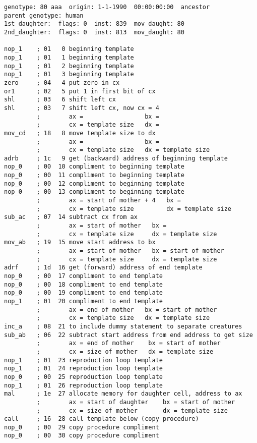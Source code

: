 \begin{verbatim}
genotype: 80 aaa  origin: 1-1-1990  00:00:00:00  ancestor
parent genotype: human
1st_daughter:  flags: 0  inst: 839  mov_daught: 80
2nd_daughter:  flags: 0  inst: 813  mov_daught: 80

nop_1    ; 01   0 beginning template
nop_1    ; 01   1 beginning template
nop_1    ; 01   2 beginning template
nop_1    ; 01   3 beginning template
zero     ; 04   4 put zero in cx
or1      ; 02   5 put 1 in first bit of cx
shl      ; 03   6 shift left cx
shl      ; 03   7 shift left cx, now cx = 4
         ;        ax =                 bx =
         ;        cx = template size   dx =
mov_cd   ; 18   8 move template size to dx
         ;        ax =                 bx =
         ;        cx = template size   dx = template size
adrb     ; 1c   9 get (backward) address of beginning template
nop_0    ; 00  10 compliment to beginning template
nop_0    ; 00  11 compliment to beginning template
nop_0    ; 00  12 compliment to beginning template
nop_0    ; 00  13 compliment to beginning template
         ;        ax = start of mother + 4   bx =
         ;        cx = template size         dx = template size
sub_ac   ; 07  14 subtract cx from ax
         ;        ax = start of mother   bx =
         ;        cx = template size     dx = template size
mov_ab   ; 19  15 move start address to bx
         ;        ax = start of mother   bx = start of mother
         ;        cx = template size     dx = template size
adrf     ; 1d  16 get (forward) address of end template
nop_0    ; 00  17 compliment to end template
nop_0    ; 00  18 compliment to end template
nop_0    ; 00  19 compliment to end template
nop_1    ; 01  20 compliment to end template
         ;        ax = end of mother   bx = start of mother
         ;        cx = template size   dx = template size
inc_a    ; 08  21 to include dummy statement to separate creatures
sub_ab   ; 06  22 subtract start address from end address to get size
         ;        ax = end of mother    bx = start of mother
         ;        cx = size of mother   dx = template size
nop_1    ; 01  23 reproduction loop template
nop_1    ; 01  24 reproduction loop template
nop_0    ; 00  25 reproduction loop template
nop_1    ; 01  26 reproduction loop template
mal      ; 1e  27 allocate memory for daughter cell, address to ax
         ;        ax = start of daughter    bx = start of mother
         ;        cx = size of mother       dx = template size
call     ; 16  28 call template below (copy procedure)
nop_0    ; 00  29 copy procedure compliment
nop_0    ; 00  30 copy procedure compliment

\end{verbatim}
